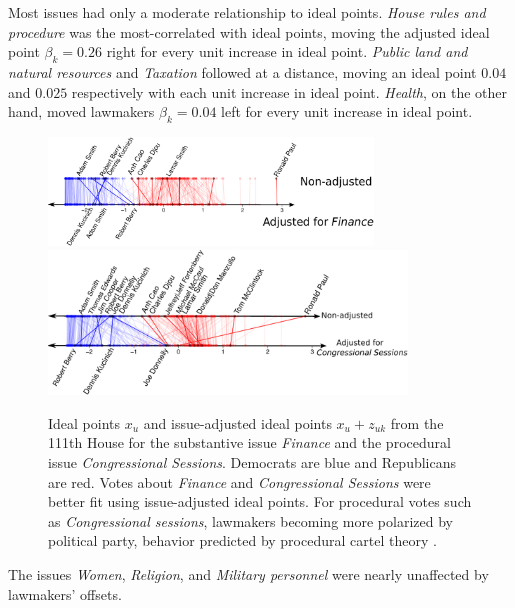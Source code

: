 Most issues had only a moderate relationship to ideal points.
\emph{House rules and procedure} was the most-correlated with ideal
points, moving the adjusted ideal point $\beta_k=0.26$ right for every
unit increase in ideal point. \emph{Public land and natural resources} and
\emph{Taxation} followed at a distance, moving an ideal point $0.04$
and $0.025$ respectively with each unit increase in ideal point.
\emph{Health}, on the other hand, moved lawmakers $\beta_k=0.04$ left
for every unit increase in ideal point.
\begin{figure}[t]
  \center
  \includegraphics[width=0.77\textwidth]{chapter_spatial_voting_with_text/figures/3393_example_ideal_points_finance.pdf}
  \vspace{-10pt}
  \includegraphics[width=0.85\textwidth]{chapter_spatial_voting_with_text/figures/3393_example_ideal_points_congressional_sessions.pdf}
  \caption{Ideal points $x_u$ and issue-adjusted ideal points $x_u +
    z_{uk}$ from the 111th House for the substantive issue
    \emph{Finance} and the procedural issue \emph{Congressional
      Sessions}. Democrats are blue and Republicans are red.  Votes
    about \emph{Finance} and \emph{Congressional Sessions} were better
    fit using issue-adjusted ideal points.  For procedural votes such
    as \emph{Congressional sessions}, lawmakers becoming more
    polarized by political party, behavior predicted by procedural
    cartel theory \citep{cox:1993}. }
  \label{figure:issue_improvements_ideals}
  \vspace{-5pt}
\end{figure}
The issues \emph{Women}, \emph{Religion}, and \emph{Military
personnel} were nearly unaffected by lawmakers' offsets.

